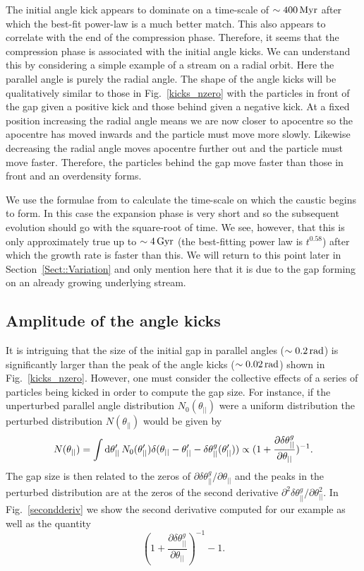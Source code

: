 \documentclass[useAMS,usenatbib,fleqn,a4paper]{mn2e}
\def\rad{\,\rm rad}
\def\Gyr{\,{\rm Gyr}}
\def\Myr{\,{\rm Myr}}
\begin{document}
The initial angle kick appears to dominate on a time-scale of $\sim400\Myr$ after which the best-fit power-law is a much better match. This also appears to correlate with the end of the compression phase. Therefore, it seems that the compression phase is associated with the initial angle kicks. We can understand this by considering a simple example of a stream on a radial orbit. Here the parallel angle is purely the radial angle. The shape of the angle kicks will be qualitatively similar to those in Fig.~\ref{kicks_nzero} with the particles in front of the gap given a positive kick and those behind given a negative kick. At a fixed position increasing the radial angle means we are now closer to apocentre so the apocentre has moved inwards and the particle must move more slowly. Likewise decreasing the radial angle moves apocentre further out and the particle must move faster. Therefore, the particles behind the gap move faster than those in front and an overdensity forms.

We use the formulae from \cite{ErkalBelokurov2015} to calculate the time-scale on which the caustic begins to form. In this case the expansion phase is very short and so the subsequent evolution should go with the square-root of time. We see, however, that this is only approximately true up to $\sim4\Gyr$ (the best-fitting power law is $t^{0.58}$) after which the growth rate is faster than this. We will return to this point later in Section~\ref{Sect::Variation} and only mention here that it is due to the gap forming on an already growing underlying stream.

\subsection{Amplitude of the angle kicks}\label{Sect::anggapamp}

It is intriguing that the size of the initial gap in parallel angles ($\sim0.2\rad$) is significantly larger than the peak of the angle kicks ($\sim0.02\rad$) shown in Fig.~\ref{kicks_nzero}. However, one must consider the collective effects of a series of particles being kicked in order to compute the gap size. For instance, if the unperturbed parallel angle distribution $N_0(\theta_{||})$ were a uniform distribution the perturbed distribution $N(\theta_{||})$ would be given by
\begin{equation}
N(\theta_{||})=\int {\rm d}\theta'_{||}\,N_0(\theta'_{||})\delta(\theta_{||}-\theta'_{||}-\delta\theta^g_{||}(\theta'_{||}))\propto(1+\frac{\partial\delta\theta^g_{||}}{\partial\theta_{||}})^{-1}.
\label{UniformAssump}
\end{equation}
The gap size is then related to the zeros of $\partial\delta\theta^g_{||}/\partial\theta_{||}$
and the peaks in the perturbed distribution are at the zeros of the second derivative
$
\partial^2\delta\theta^g_{||}/\partial\theta^{2}_{||}.
$
In Fig.~\ref{secondderiv} we show the second derivative computed for our example as well as the quantity
\begin{equation}
(1+\frac{\partial\delta\theta^g_{||}}{\partial\theta_{||}})^{-1}-1.
\label{deriv}
\end{equation}
\end{document}
